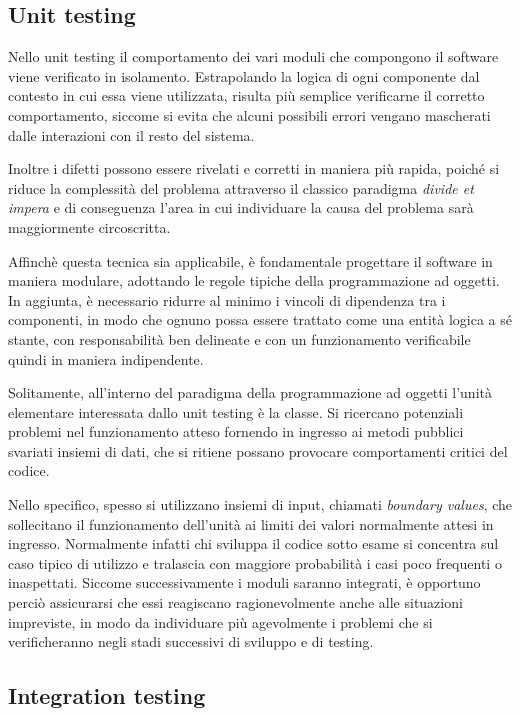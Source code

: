 \subsection{Unit testing}
Nello unit testing il comportamento dei vari moduli che compongono il software viene verificato in isolamento. Estrapolando la logica di ogni componente dal contesto in cui essa viene utilizzata, risulta più semplice verificarne il corretto comportamento, siccome si evita che alcuni possibili errori vengano mascherati dalle interazioni con il resto del sistema. 

Inoltre i difetti possono essere rivelati e corretti in maniera più rapida, poiché si riduce la complessità del problema attraverso il classico paradigma \emph{divide et impera} e di conseguenza l'area in cui individuare la causa del problema sarà maggiormente circoscritta.

Affinchè questa tecnica sia applicabile, è fondamentale progettare il software in maniera modulare, adottando le regole tipiche della programmazione ad oggetti. In aggiunta, è necessario ridurre al minimo i vincoli di dipendenza tra i componenti, in modo che ognuno possa essere trattato come una entità logica a sé stante, con responsabilità ben delineate e con un funzionamento verificabile quindi in maniera indipendente.

Solitamente, all'interno del paradigma della programmazione ad oggetti l'unità elementare interessata dallo unit testing è la classe. Si ricercano potenziali problemi nel funzionamento atteso fornendo in ingresso ai metodi pubblici
svariati insiemi di dati, che si ritiene possano provocare comportamenti critici del codice. 

Nello specifico, spesso si utilizzano insiemi di input, chiamati \emph{boundary values}, che sollecitano il funzionamento dell'unità ai limiti dei valori normalmente attesi in ingresso. 
Normalmente infatti chi sviluppa il codice sotto esame si concentra sul caso tipico di utilizzo e tralascia con maggiore probabilità i casi poco frequenti o inaspettati. Siccome successivamente i moduli saranno integrati, è opportuno perciò assicurarsi che essi reagiscano ragionevolmente anche alle situazioni impreviste, in modo da individuare più agevolmente i problemi che si verificheranno negli stadi successivi di sviluppo e di testing.

\subsection{Integration testing}

